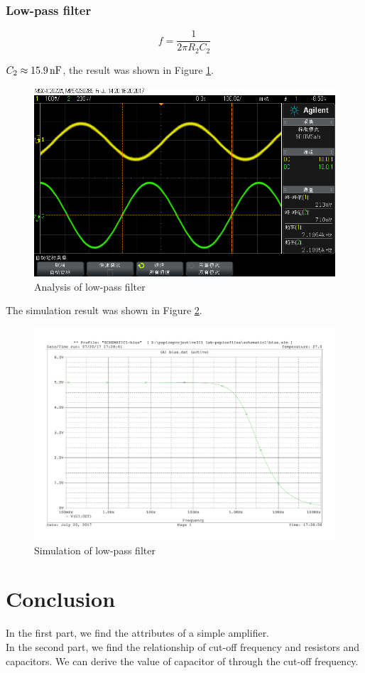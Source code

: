 \documentclass{article}
\newcommand{\unit}[1]{{\rm\,#1}}
\begin{document}
\subsubsection{Low-pass filter}

$$f=\frac{1}{2\pi R_2C_2}$$

$C_2\approx 15.9\unit{nF}$, the result was shown in Figure \ref{fig-2-3}.

\begin{figure}[htbp]
	\centering
	\includegraphics[width=0.6\linewidth]{imgs/scope_26.png}
	\caption{Analysis of low-pass filter}
	\label{fig-2-3}
\end{figure}

The simulation result was shown in Figure \ref{fig-2-4}.

\begin{figure}[htbp]
	\centering
	\includegraphics[width=0.6\linewidth]{imgs/low.png}
	\caption{Simulation of low-pass filter}
	\label{fig-2-4}
\end{figure}

\newpage

\section{Conclusion}

In the first part, we find the attributes of a simple amplifier.\\

In the second part, we find the relationship of cut-off frequency and resistors and capacitors. We can derive the value of capacitor of through the cut-off frequency.
\end{document}
